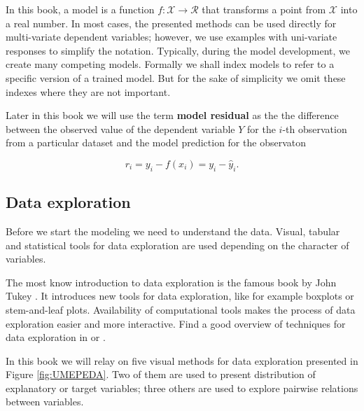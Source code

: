 \documentclass[12pt,]{krantz}
\begin{document}
In this book, a model is a function \(f:\mathcal X \rightarrow \mathcal R\) that transforms a point from \(\mathcal X\) into a real number. In most cases, the presented methods can be used directly for multi-variate dependent variables; however, we use examples with uni-variate responses to simplify the notation.
Typically, during the model development, we create many competing models. Formally we shall index models to refer to a specific version of a trained model. But for the sake of simplicity we omit these indexes where they are not important.

Later in this book we will use the term \textbf{model residual} as the the difference between the observed value of the dependent variable \(Y\) for the \(i\)-th observation from a particular dataset and the model prediction for the observaton

\begin{equation}
r_i = y_i - f(x_i) = y_i - \hat y_i.
\label{eq:modelResiduals}
\end{equation}

\hypertarget{data-exploration}{%
\subsection{Data exploration}\label{data-exploration}}

Before we start the modeling we need to understand the data.
Visual, tabular and statistical tools for data exploration are used depending on the character of variables.

The most know introduction to data exploration is the famous book by John Tukey \citep{tukey1977}. It introduces new tools for data exploration, like for example boxplots or stem-and-leaf plots. Availability of computational tools makes the process of data exploration easier and more interactive. Find a good overview of techniques for data exploration in \citep{Nolan2015} or \citep{Wickham2017}.

In this book we will relay on five visual methods for data exploration presented in Figure \ref{fig:UMEPEDA}. Two of them are used to present distribution of explanatory or target variables; three others are used to explore pairwise relations between variables.
\end{document}
